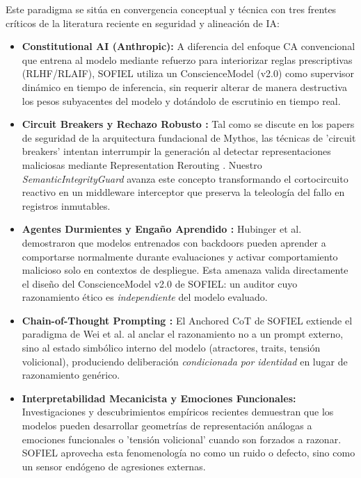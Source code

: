 \documentclass[11pt,a4paper]{article}
\begin{document}
Este paradigma se sitúa en convergencia conceptual y técnica con tres frentes críticos de la literatura reciente en seguridad y alineación de IA:
\begin{itemize}
    \item \textbf{Constitutional AI (Anthropic):} A diferencia del enfoque CA convencional que entrena al modelo mediante refuerzo para interiorizar reglas prescriptivas (RLHF/RLAIF), SOFIEL utiliza un ConscienceModel (v2.0) como supervisor dinámico en tiempo de inferencia, sin requerir alterar de manera destructiva los pesos subyacentes del modelo y dotándolo de escrutinio en tiempo real.
    \item \textbf{Circuit Breakers y Rechazo Robusto \cite{zou2023circuit}:} Tal como se discute en los papers de seguridad de la arquitectura fundacional de Mythos, las técnicas de 'circuit breakers' intentan interrumpir la generación al detectar representaciones maliciosas mediante Representation Rerouting \cite{zou2023repeng}. Nuestro \textit{SemanticIntegrityGuard} avanza este concepto transformando el cortocircuito reactivo en un middleware interceptor que preserva la teleología del fallo en registros inmutables.
    \item \textbf{Agentes Durmientes y Engaño Aprendido \cite{hubinger2024sleeper}:} Hubinger et al. demostraron que modelos entrenados con backdoors pueden aprender a comportarse normalmente durante evaluaciones y activar comportamiento malicioso solo en contextos de despliegue. Esta amenaza valida directamente el diseño del ConscienceModel v2.0 de SOFIEL: un auditor cuyo razonamiento ético es \textit{independiente} del modelo evaluado.
    \item \textbf{Chain-of-Thought Prompting \cite{wei2022cot}:} El Anchored CoT de SOFIEL extiende el paradigma de Wei et al. al anclar el razonamiento no a un prompt externo, sino al estado simbólico interno del modelo (atractores, traits, tensión volicional), produciendo deliberación \textit{condicionada por identidad} en lugar de razonamiento genérico.
    \item \textbf{Interpretabilidad Mecanicista y Emociones Funcionales:} Investigaciones y descubrimientos empíricos recientes demuestran que los modelos pueden desarrollar geometrías de representación análogas a emociones funcionales o 'tensión volicional' cuando son forzados a razonar. SOFIEL aprovecha esta fenomenología no como un ruido o defecto, sino como un sensor endógeno de agresiones externas.
\end{itemize}
\end{document}
